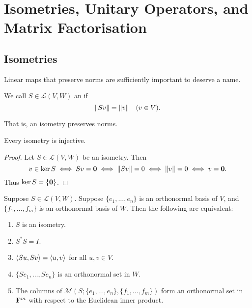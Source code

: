 \section{Isometries, Unitary Operators, and Matrix Factorisation}
\subsection{Isometries}
Linear maps that preserve norms are sufficiently important to deserve a name.

\begin{definition}[Isometry]
We call $S\in\mathcal{L}(V,W)$ an  if
\[\norm{Sv}=\norm{v}\quad(v\in V).\]
\end{definition}

That is, an isometry preserves norms.

\begin{lemma}
Every isometry is injective.
\end{lemma}

\begin{proof}
Let $S\in\mathcal{L}(V,W)$ be an isometry. Then
\[v\in\ker S
\iff Sv=\vb{0}
\iff\norm{Sv}=0
\iff\norm{v}=0
\iff v=\vb{0}.\]
Thus $\ker S=\{\vb{0}\}$.
\end{proof}

\begin{lemma}\label{lemma:isometry-characterisation}
Suppose $S\in\mathcal{L}(V,W)$. Suppose $\{e_1,\dots,e_n\}$ is an orthonormal basis of $V$, and $\{f_1,\dots,f_m\}$ is an orthonormal basis of $W$. Then the following are equivalent:
\begin{enumerate}[label=(\roman*)]
\item $S$ is an isometry.
\item $S^*S=I$.
\item $\left\langle Su,Sv\right\rangle=\left\langle u,v\right\rangle$ for all $u,v\in V$.
\item $\{Se_1,\dots,Se_n\}$ is an orthonormal set in $W$.
\item The columns of $\mathcal{M}(S;\{e_1,\dots,e_n\},\{f_1,\dots,f_m\})$ form an orthonormal set in $\mathbf F^m$ with respect to the Euclidean inner product.
\end{enumerate}
\end{lemma}

